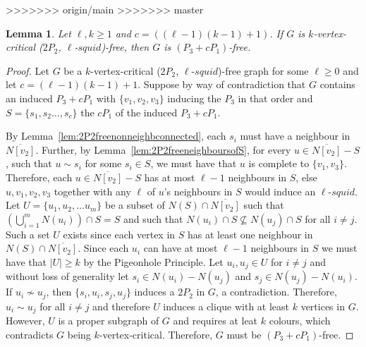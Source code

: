 \documentclass[11pt]{article}
\newtheorem{lemma}[theorem]{Lemma}
\theoremstyle{definition}
\newcommand{\squid}[1]{$#1$-$squid$}
\begin{document}
>>>>>>> origin/main
>>>>>>> master
\begin{lemma}\label{lem:2P2ellsquidP3cP1fee}
Let $\ell,k\ge 1$ and $c=((\ell-1)(k-1)+1)$. If $G$ is $k$-vertex-critical ($2P_2$, \squid{\ell})-free, then $G$ is $(P_3+ cP_1)$-free.
\end{lemma}
\begin{proof}
Let $G$ be a $k$-vertex-critical ($2P_2$, \squid{\ell})-free graph for some $\ell\ge 0$ and let $c=(\ell-1)(k-1)+1$. Suppose by way of contradiction that $G$ contains an induced $P_3+c P_1$ with $\{v_1,v_2,v_3\}$ inducing the $P_3$ in that order and $S=\{s_1,s_2\dots, s_c\}$ the $c P_1$ of the induced $P_3+c P_1$. 

By Lemma~\ref{lem:2P2freenonneighbconnected}, each $s_i$ must have a neighbour in $\overline{N[v_2]}$. Further, by Lemma~\ref{lem:2P2freeneighboursofS}, for every $u\in \overline{N[v_2]}-S$, such that $u\sim s_i$ for some $s_i\in S$, we must have that $u$ is complete to $\{v_1,v_3\}$. Therefore, each $u\in \overline{N[v_2]}-S$  has at most $\ell-1$ neighbours in $S$, else $u,v_1,v_2,v_3$ together with any $\ell$ of $u$'s neighbours in $S$ would induce an \squid{\ell}. Let $U=\{u_1,u_2,\dots u_m\}$ be a subset of $N(S)\cap \overline{N[v_2]}$ such that $\left(\bigcup_{i=1}^{m} N(u_i)\right)\cap S = S$ and such that $N(u_i)\cap S\not\subseteq N(u_j)\cap S$ for all $i\neq j$. Such a set $U$ exists since each vertex in $S$ has at least one neighbour in $N(S)\cap \overline{N[v_2]}$. %
Since each $u_i$ can have at most $\ell-1$ neighbours in $S$ we must have that $|U|\ge k$ by the Pigeonhole Principle. Let $u_i,u_j\in U$ for $i\neq j$ and without loss of generality let $s_i\in N(u_i)-N(u_j)$ and $s_j\in N(u_j)-N(u_i)$. If $u_i\nsim u_j$, then $\{s_i,u_i,s_j,u_j\}$ induces a $2P_2$ in $G$, a contradiction. Therefore, $u_i\sim u_j$ for all $i\neq j$ and therefore $U$ induces a clique with at least $k$ vertices in $G$. However, $U$ is a proper subgraph of $G$ and requires at leat $k$ colours, which contradicts $G$ being $k$-vertex-critical. Therefore, $G$ must be $(P_3+ cP_1)$-free.
\end{proof}
\end{document}

